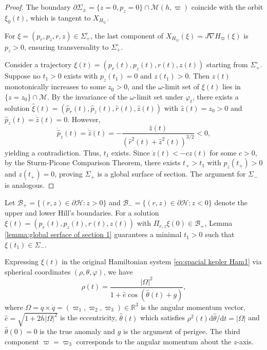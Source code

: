 \documentclass[11pt]{amsart}
\newcommand{\om}{\varpi}
\begin{document}
\begin{proof}
	The boundary $\partial \Sigma_{\pm }=\{z=0,p_{z}=0\}\cap \mathcal{M}(h,\om)$ coincide with the orbit $ \xi_0(t) $, which is tangent to $ X_{H_\om} $.
	
	For $\xi=(p_{r},p_{z},r,z)\in\Sigma_{+}^{\circ}$, the last component of $X_{H_{\om}}(\xi)=J\nabla H_{\om}(\xi)$ is $ p_z > 0 $, ensuring transversality to $ \Sigma_+^\circ $. 
	
	Consider a trajectory $\xi(t)=(p_{r}(t),p_{z}(t),r(t),z(t))$ starting from $\Sigma_{+}^{\circ}$. Suppose no $ t_1 > 0 $ exists with $ p_z(t_1) = 0 $ and $ z(t_1) > 0 $. Then $ z(t) $ monotonically increases to some $ z_0 > 0 $, and the $ \omega $-limit set of $ \xi(t) $ lies in $\{z=z_{0}\}\cap \mathcal{M}$. By the invariance of the $ \omega $-limit set under $\varphi_{t}$, there exists a solution $\hat{\xi}(t)=(\hat{p}_{r}(t),\hat{p}_{z}(t),\hat{r}(t),\hat{z}(t))$ with $\hat{z}(t)=z_{0}>0$ and $\hat{p}_{z}(t)=\dot{\hat{z}}(t)=0$. However,  
	\begin{equation*}
		\dot{\hat{p}}_{z}(t)=\ddot{\hat{z}}(t)=-\frac{\hat{z}(t)}{(\hat{r}^{2}(t)+\hat{z}^{2}(t))^{3\slash 2}}<0,
	\end{equation*}
	yielding a contradiction. Thus, $ t_1 $ exists. 
	Since $\ddot{z}(t)<-cz(t)$ for some $c>0$, by the Sturm-Picone Comparison Theorem, there exists $t_{+}>t_{1}$ with $ p_z(t_+) > 0 $ and $ z(t_+) = 0 $, proving $ \Sigma_+ $ is a global surface of section. The argument for $ \Sigma_- $ is analogous.
\end{proof}

Let  $\mathcal{B}_{+}=\{(r,z)\in\partial\mathcal{H}:z>0\}$ and $\mathcal{B}_{-}=\{(r,z)\in\partial\mathcal{H}:z<0\}$ denote the upper and lower Hill’s boundaries. For a solution $\xi(t)=(p_{r}(t),p_{z}(t),r(t),z(t))$ with $\Pi_{r,z}\xi(0)\in\mathcal{B}_{+}$, Lemma \ref{lemma:global serface of section 1} guarantees a minimal $t_{1}>0$ such that $\xi(t_{1})\in\Sigma_-$.
 
Expressing $\xi(t)$ in the original Hamiltonian system \eqref{eq:spacial kepler Ham1} via spherical coordinates $ (\rho, \theta, \varphi) $, we have  
\begin{equation}\label{eq:Kepler explicitly}
	\rho(t)=\frac{|\Omega|^{2}}{1+\hat{e}\cos{(\hat{\theta}(t)+g)}},
\end{equation}   
where $\Omega=q\times\dot{q}=(\om_{1},\om_{2},\om_{3})\in\mathbb{R}^{3}$ is the angular momentum vector, $\hat{e}=\sqrt{1+2h|\Omega|^{2}}$ is the eccentricity, $\hat{\theta}(t)$ which satisfies $\rho^2(t)\mathrm{d}\hat{\theta}/\mathrm{d}t=|\Omega|$ and $\hat{\theta}(0)=0$ is the true anomaly and $g$ is the argument of perigee. The third component $ \om = \om_3 $ corresponds to the angular momentum about the $ z $-axis.
\end{document}
